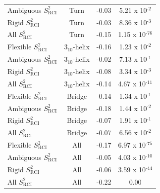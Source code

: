 \begin{table}[H]
\begin{tabular}{@{}lccc@{}}
Ambiguous $S_{\text{RCI}}^{2}$ & Turn                & -0.03                       & 5.21 x 10$^{\text{-2}}$      \\
Rigid $S_{\text{RCI}}^{2}$     & Turn                & -0.03                       & 8.36 x 10$^{\text{-3}}$      \\
All $S_{\text{RCI}}^{2}$       & Turn                & -0.15                       & 1.15 x 10$^{\text{-76}}$     \\
\arrayrulecolor[gray]{0.8}\hline
Flexible $S_{\text{RCI}}^{2}$  & 3$_{10}$-helix      & -0.16                       & 1.23 x 10$^{\text{-2}}$      \\
Ambiguous $S_{\text{RCI}}^{2}$ & 3$_{10}$-helix      & -0.02                       & 7.13 x 10$^{\text{-1}}$      \\
Rigid $S_{\text{RCI}}^{2}$     & 3$_{10}$-helix      & -0.08                       & 3.34 x 10$^{\text{-3}}$      \\
All $S_{\text{RCI}}^{2}$       & 3$_{10}$-helix      & -0.14                       & 4.67 x 10$^{\text{-11}}$     \\
\arrayrulecolor[gray]{0.8}\hline
Flexible $S_{\text{RCI}}^{2}$  & Bridge              & -0.14                       & 1.34 x 10$^{\text{-1}}$      \\
Ambiguous $S_{\text{RCI}}^{2}$ & Bridge              & -0.18                       & 1.44 x 10$^{\text{-2}}$      \\
Rigid $S_{\text{RCI}}^{2}$     & Bridge              & -0.07                       & 1.91 x 10$^{\text{-1}}$      \\
All $S_{\text{RCI}}^{2}$       & Bridge              & -0.07                       & 6.56 x 10$^{\text{-2}}$      \\
\arrayrulecolor[gray]{0.8}\hline
Flexible $S_{\text{RCI}}^{\text{2}}$  & All                 & -0.17                       & 6.97 x 10$^{\text{-75}}$     \\
Ambiguous $S_{\text{RCI}}^{\text{2}}$ & All                 & -0.05                       & 4.03 x 10$^{\text{-10}}$     \\
Rigid $S_{\text{RCI}}^{\text{2}}$     & All                 & -0.06                       & 3.59 x 10$^{\text{-44}}$     \\
All $S_{\text{RCI}}^{\text{2}}$       & All                 & -0.22                       & 0.00                         \\ \bottomrule
\end{tabular}
\end{table}

